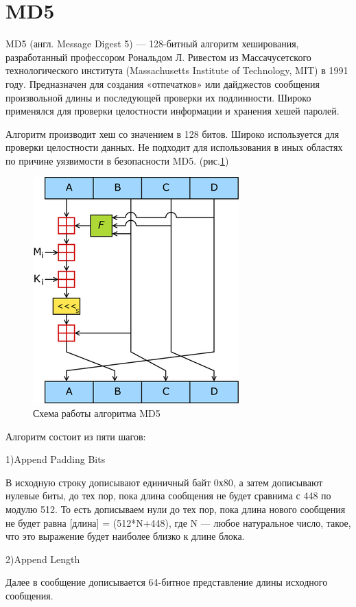 \documentclass[a4paper, 12pt, oneside]{scrartcl}
\begin{document}
	\section{MD5}\label{sec:section2}
	MD5 (англ. Message Digest 5) — 128-битный алгоритм хеширования, разработанный профессором Рональдом Л. Ривестом из Массачусетского технологического института (Massachusetts Institute of Technology, MIT) в 1991 году.
	Предназначен для создания «отпечатков» или дайджестов сообщения произвольной длины и последующей проверки их подлинности.
	Широко применялся для проверки целостности информации и хранения хешей паролей.
	
	Алгоритм производит хеш со значением в 128 битов. Широко используется для проверки целостности данных.
	Не подходит для использования в иных областях по причине уязвимости в безопасности MD5. (рис.\ref{fig:key})
	\begin{figure}[h!]
		\centering
		\includegraphics[scale=0.9]{MD5}
		\caption{Схема работы алгоритма MD5}
		\label{fig:key}
	\end{figure}
	\par
	Алгоритм состоит из пяти шагов:\par
	1)Append Padding Bits\par
	В исходную строку дописывают единичный байт 0х80, а затем дописывают нулевые биты, до тех пор, пока длина сообщения не будет сравнима с 448 по модулю 512.
	То есть дописываем нули до тех пор, пока длина нового сообщения не будет равна [длина] = (512*N+448), где N — любое натуральное число, такое, что это выражение будет наиболее близко к длине блока.
	
	2)Append Length\par
	Далее в сообщение дописывается 64-битное представление длины исходного сообщения.
	
\end{document}
